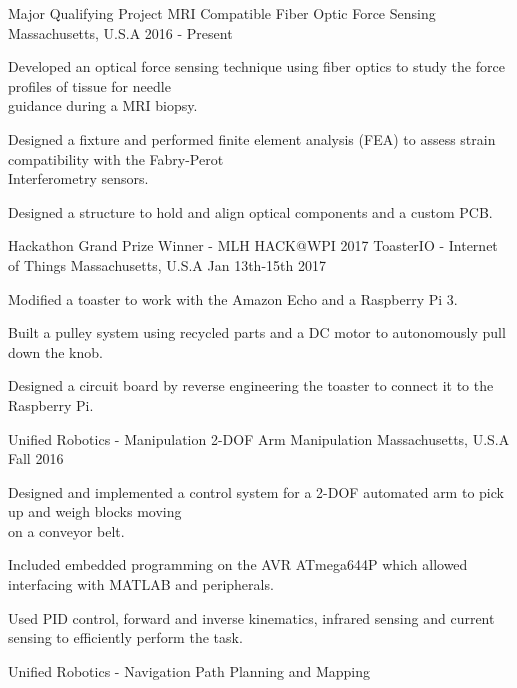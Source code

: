 \vspace{10pt}
\begin{cventries}
  \cventry
    {Major Qualifying Project}
    {MRI Compatible Fiber Optic Force Sensing}
    {Massachusetts, U.S.A}
    {2016 - Present}
    {
      \begin{cvitems}
        \item {Developed an optical force sensing technique using fiber optics to study the force profiles of tissue for needle \\guidance during a MRI biopsy.}
        \item {Designed a fixture and performed finite element analysis (FEA) to assess strain compatibility with the Fabry-Perot \\Interferometry sensors.}
        \item {Designed a structure to hold and align optical components and a custom PCB.}
      \end{cvitems}
    }
  	\cventry
    {Hackathon Grand Prize Winner - MLH HACK@WPI 2017}
    {ToasterIO - Internet of Things}
    {Massachusetts, U.S.A}
    {Jan 13th-15th 2017}
    {
      \begin{cvitems}
        \item {Modified a toaster to work with the Amazon Echo and a Raspberry Pi 3.}
        \item{Built a pulley system using recycled parts and a DC motor to autonomously pull down the knob.}
        \item{Designed a circuit board by reverse engineering the toaster to connect it to the Raspberry Pi.}
      \end{cvitems}
    }
  \cventry
    {Unified Robotics - Manipulation}
    {2-DOF Arm Manipulation}
    {Massachusetts, U.S.A}
    {Fall 2016}
    {
      \begin{cvitems}
        \item {Designed and implemented a control system for  a 2-DOF automated arm to pick up and weigh blocks moving \\on a conveyor belt.}
       \item {Included embedded programming on the AVR ATmega644P which allowed interfacing with MATLAB and peripherals.}
       \item {Used PID control, forward and inverse kinematics, infrared sensing and current sensing to efficiently perform the task.}
      \end{cvitems}
    }    
	\cventry
    {Unified Robotics - Navigation}
    {Path Planning and Mapping}

\end{cventries}
